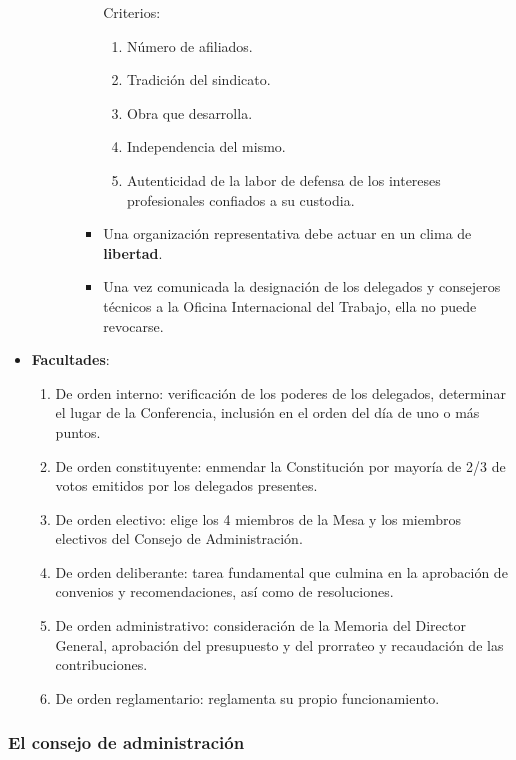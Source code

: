 \documentclass[spanish,12pt,a4paper,titlepage]{report}
\begin{document}
\begin{itemize}
\begin{itemize}
\begin{enumerate}
\begin{itemize}
      Criterios:
      \begin{enumerate}
      \item Número de afiliados.
      \item Tradición del sindicato.
      \item Obra que desarrolla.
      \item Independencia del mismo.
      \item Autenticidad de la labor de defensa de los intereses profesionales confiados a su custodia.
      \end{enumerate}
    \item Una organización representativa debe actuar en un clima de \textbf{libertad}.
    \item Una vez comunicada la designación de los delegados y consejeros técnicos a la Oficina Internacional del Trabajo, ella no puede revocarse.
    \end{itemize}
  \end{enumerate}
\end{itemize}
\item \textbf{Facultades}:
  \begin{enumerate}
  \item De orden interno: verificación de los poderes de los delegados, determinar el lugar de la Conferencia, inclusión en el orden del día de uno o más puntos.
  \item De orden constituyente: enmendar la Constitución por mayoría de 2/3 de votos emitidos por los delegados presentes.
  \item De orden electivo: elige los 4 miembros de la Mesa y los miembros electivos del Consejo de Administración.
  \item De orden deliberante: tarea fundamental que culmina en la aprobación de convenios y recomendaciones, así como de resoluciones.
  \item De orden administrativo: consideración de la Memoria del Director General, aprobación del presupuesto y del prorrateo y recaudación de las contribuciones.
  \item De orden reglamentario: reglamenta su propio funcionamiento.
  \end{enumerate}
\end{itemize}

\subsubsection{El consejo de administración}
\label{sec:el-consejo-de-administracion}
\end{document}
